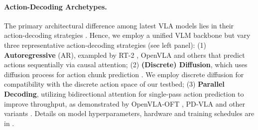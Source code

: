 \documentclass[11pt]{article}
\begin{document}



\paragraph{Action-Decoding Archetypes.} The primary architectural difference among latest VLA models lies in their action-decoding strategies \citep{zhong2025survey}. Hence, we employ a unified VLM backbone but vary three representative action-decoding strategies (see  left panel): (1) \textbf{Autoregressive} (AR), exampled by RT-2 \citep{DBLP:conf/corl/ZitkovichYXXXXW23}, OpenVLA \citep{DBLP:conf/corl/KimPKXB0RFSVKBT24} and others \citep{DBLP:journals/tmlr/ReedZPCNBGSKSEBREHCHVBF22,DBLP:conf/icml/HuangYMLLW0ZJ024,DBLP:conf/icra/ONeillRMGPLPGMJ24} that predict actions sequentially via causal attention; (2) \textbf{(Discrete) Diffusion}, which uses diffusion process for action chunk prediction \citep{pmlr-v305-black25a,bjorck2025gr00t,shukor2025smolvla}. We employ discrete diffusion \citep{liang2025discrete} for compatibility with the discrete action space of our testbed; (3) \textbf{Parallel Decoding}, utilizing bidirectional attention for single-pass action prediction to improve throughput, as demonstrated by OpenVLA-OFT \citep{kim2025fine}, PD-VLA \citep{DBLP:conf/iros/SongCDZZZGLWWML25} and other variants \citep{yin2025deepthinkvla,wang2025bitvla,xiao2025ava}. Details on model hyperparameters, hardware and training schedules are in .
\end{document}

